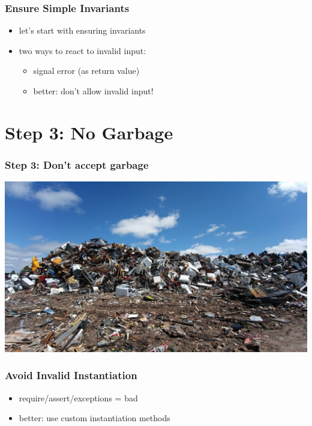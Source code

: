 \documentclass{beamer}
\begin{document}
\begin{frame}
  \frametitle{Ensure Simple Invariants}
  \begin{itemize}
  \item let's start with ensuring invariants
  \item two ways to react to invalid input:
    \begin{itemize}
    \item signal error (as return value)
    \item better: don't allow invalid input!
    \end{itemize}
  \end{itemize}
\end{frame}

\section{Step 3: No Garbage}

\begin{frame}
  \frametitle{Step 3: Don't accept garbage}
  \includegraphics[width=\textwidth]{../pics/scrapyard-2441432_1280.jpg}
\end{frame}

\begin{frame}
  \frametitle{Avoid Invalid Instantiation}
  \begin{itemize}
  \item require/assert/exceptions = bad
  \item better: use custom instantiation methods
  \end{itemize}
\end{frame}
\end{document}
